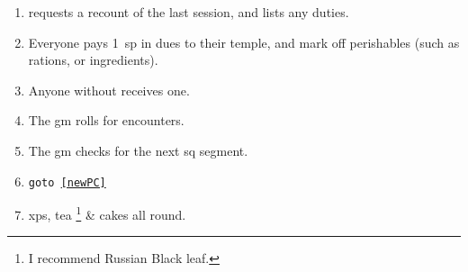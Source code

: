 
\begin{enumerate}
  \item
   requests a recount of the last session, and lists any duties.
  \item
  Everyone pays 1~\gls{sp} in dues to their temple, and mark off perishables (such as rations, or \glspl{ingredient}).
  \item
  Anyone without  receives one.
  \label{newPC}
  \item
  The \gls{gm} rolls for encounters.
  \label{gmRollsEncounters}
  \item
  The \gls{gm} checks for the next \gls{sq} \gls{segment}.
  \item
  {\tt goto \ref{newPC}}
  \item
  \Glspl{xp}, tea%
  \ifodd\value{r3}\footnote{I recommend Russian Black leaf.}\fi
  \& cakes all round.
\end{enumerate}

